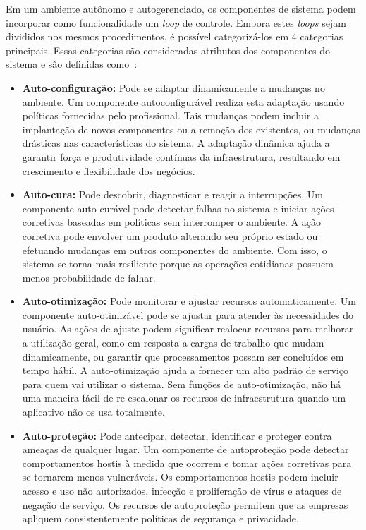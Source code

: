 \documentclass[portugues]{ic-tese}
\begin{document}
Em um ambiente autônomo e autogerenciado, os componentes de sistema podem incorporar como funcionalidade um \textit{loop} de controle. Embora estes \textit{loops} sejam divididos nos mesmos procedimentos, é possível categorizá-los em 4 categorias principais. Essas categorias são consideradas atributos dos componentes do sistema e são definidas como~\citep{IBM_2005}:

\begin{itemize}
\item \textbf{Auto-configuração:} Pode se adaptar dinamicamente a mudanças no ambiente. Um componente autoconfigurável realiza esta adaptação usando políticas fornecidas pelo profissional. Tais mudanças podem incluir a implantação de novos componentes ou a remoção dos existentes, ou mudanças drásticas nas características do sistema. A adaptação dinâmica ajuda a garantir força e produtividade contínuas da infraestrutura, resultando em crescimento e flexibilidade dos negócios.
\item \textbf{Auto-cura:} Pode descobrir, diagnosticar e reagir a interrupções. Um componente auto-curável pode detectar falhas no sistema e iniciar ações corretivas baseadas em políticas sem interromper o ambiente. A ação corretiva pode envolver um produto alterando seu próprio estado ou efetuando mudanças em outros componentes do ambiente. Com isso, o sistema se torna mais resiliente porque as operações cotidianas possuem menos probabilidade de falhar.
\item \textbf{Auto-otimização:} Pode monitorar e ajustar recursos automaticamente. Um componente auto-otimizável pode se ajustar para atender às necessidades do usuário. As ações de ajuste podem significar realocar recursos para melhorar a utilização geral, como em resposta a cargas de trabalho que mudam dinamicamente, ou garantir que processamentos possam ser concluídos em tempo hábil. A auto-otimização ajuda a fornecer um alto padrão de serviço para quem vai utilizar o sistema. Sem funções de auto-otimização, não há uma maneira fácil de re-escalonar os recursos de infraestrutura quando um aplicativo não os usa totalmente.
\item \textbf{Auto-proteção:} Pode antecipar, detectar, identificar e proteger contra ameaças de qualquer lugar. Um componente de autoproteção pode detectar comportamentos hostis à medida que ocorrem e tomar ações corretivas para se tornarem menos vulneráveis. Os comportamentos hostis podem incluir acesso e uso não autorizados, infecção e proliferação de vírus e ataques de negação de serviço. Os recursos de autoproteção permitem que as empresas apliquem consistentemente políticas de segurança e privacidade.
\end{itemize}
\end{document}
